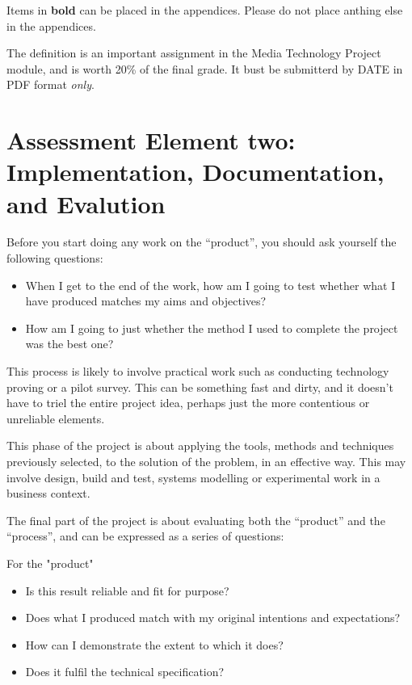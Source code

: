 Items in \textbf{bold} can be placed in the appendices. Please do not place anthing else in the appendices. 

\begin{tcolorbox}
    The definition is an important assignment in the Media Technology Project module, and is worth 20\% of the final grade. It bust be submitterd by DATE in PDF format \textit{only}. 
\end{tcolorbox}

\section{Assessment Element two: Implementation, Documentation, and Evalution}

Before you start doing any work on the “product”, you should ask yourself the following questions:

\begin{itemize}
    \item When I get to the end of the work, how am I going to test whether what I have produced matches my aims and objectives?
    \item How am I going to just whether the method I used to complete the project was the best one? 
\end{itemize}

This process is likely to involve practical work such as conducting technology proving or a pilot survey. This can be something fast and dirty, and it doesn't have to triel the entire project idea, perhaps just the more contentious or unreliable elements. 

This phase of the project is about applying the tools, methods and techniques previously selected, to the solution of the problem, in an effective way. This may involve design, build and test, systems modelling or experimental work in a business context.

The final part of the project is about evaluating both the “product” and the “process”, and can be expressed as a series of questions:

For the "product"

\begin{itemize}
    \item Is this result reliable and fit for purpose?
    \item Does what I produced match with my original intentions and expectations?
    \item How can I demonstrate the extent to which it does? 
    \item Does it fulfil the technical specification?
\end{itemize}

